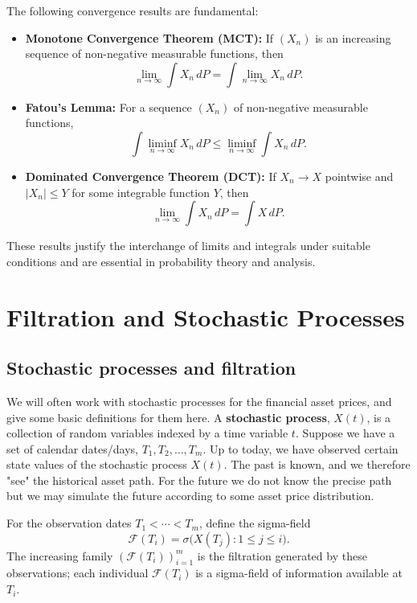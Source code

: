 \par
The following convergence results are fundamental:

\begin{itemize}
    \item \textbf{Monotone Convergence Theorem (MCT):}  
    If $(X_n)$ is an increasing sequence of non-negative measurable functions, then
    \[
    \lim_{n \to \infty} \int X_n\, dP = \int \lim_{n \to \infty} X_n\, dP.
    \]

    \item \textbf{Fatou's Lemma:}  
    For a sequence $(X_n)$ of non-negative measurable functions,
    \[
    \int \liminf_{n \to \infty} X_n\, dP \leq \liminf_{n \to \infty} \int X_n\, dP.
    \]

    \item \textbf{Dominated Convergence Theorem (DCT):}  
    If $X_n \to X$ pointwise and $|X_n| \leq Y$ for some integrable function $Y$, then
    \[
    \lim_{n \to \infty} \int X_n\, dP = \int X\, dP.
    \]
\end{itemize}

\par
These results justify the interchange of limits and integrals under suitable conditions and are essential in probability theory and analysis.

\section{Filtration and Stochastic Processes}
\subsection{Stochastic processes and filtration}
We will often work with stochastic processes for the financial asset prices, and give some basic definitions for them here.
A \textbf{stochastic process}, $X(t)$, is a collection of random variables indexed by a time variable $t$.
Suppose we have a set of calendar dates/days, $T_1, T_2, \ldots, T_m$. Up to today, we have observed certain state values of the stochastic process $X(t)$. The past is known, and we therefore "see" the historical asset path. For the future we do not know the precise path but we may simulate the future according to some asset price distribution.

For the observation dates $T_1<\cdots<T_m$, define the sigma-field
\[
\mathcal F(T_i)=\sigma\bigl(X(T_j):1\le j\le i\bigr).
\]
The increasing family $(\mathcal F(T_i))_{i=1}^m$ is the filtration
generated by these observations; each individual $\mathcal F(T_i)$ is a
sigma-field of information available at $T_i$.

